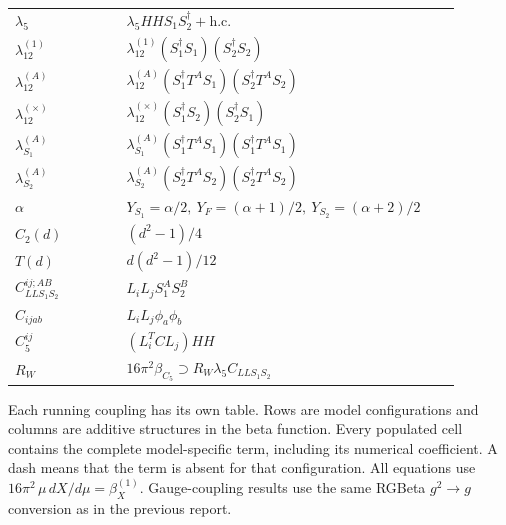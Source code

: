 \documentclass[8pt]{article}
\begin{document}
\begin{landscape}
\begin{longtable}{@{}p{0.23\linewidth}p{0.69\linewidth}@{}}
$\lambda_5$ & $\lambda_5HHS_1S_2^\dagger+\mathrm{h.c.}$ \\
$\lambda_{12}^{(1)}$ & $\lambda_{12}^{(1)}(S_1^\dagger S_1)(S_2^\dagger S_2)$ \\
$\lambda_{12}^{(A)}$ & $\lambda_{12}^{(A)}(S_1^\dagger T^AS_1)(S_2^\dagger T^AS_2)$ \\
$\lambda_{12}^{(\times)}$ & $\lambda_{12}^{(\times)}(S_1^\dagger S_2)(S_2^\dagger S_1)$ \\
$\lambda_{S_1}^{(A)}$ & $\lambda_{S_1}^{(A)}(S_1^\dagger T^A S_1)(S_1^\dagger T^A S_1)$ \\
$\lambda_{S_2}^{(A)}$ & $\lambda_{S_2}^{(A)}(S_2^\dagger T^A S_2)(S_2^\dagger T^A S_2)$ \\
$\alpha$ & $Y_{S_1}=\alpha/2,\ Y_F=(\alpha+1)/2,\ Y_{S_2}=(\alpha+2)/2$ \\
$C_2(d)$ & $(d^2-1)/4$ \\
$T(d)$ & $d(d^2-1)/12$ \\
$C_{LLS_1S_2}^{ij;AB}$ & $L_iL_jS_1^AS_2^B$ \\
$C_{ijab}$ & $L_iL_j\phi_a\phi_b$ \\
$C_5^{ij}$ & $(L_i^TCL_j)HH$ \\
$R_W$ & $16\pi^2\beta_{C_5}\supset R_W\lambda_5C_{LLS_1S_2}$ \\
\bottomrule
\end{longtable}
Each running coupling has its own table. Rows are model configurations and columns are additive structures in the beta function. Every populated cell contains the complete model-specific term, including its numerical coefficient. A dash means that the term is absent for that configuration.
\medskip
All equations use $16\pi^2\,\mu\,dX/d\mu=\beta_X^{(1)}$. Gauge-coupling results use the same RGBeta $g^2\rightarrow g$ conversion as in the previous report.

\end{landscape}
\end{document}
